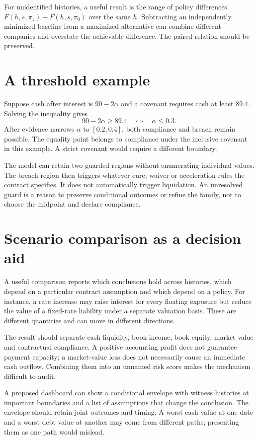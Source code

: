 For unidentified histories, a useful result is the range of policy differences $F(h,s,\pi_1)-F(h,s,\pi_0)$ over the same $h$. Subtracting an independently minimized baseline from a maximized alternative can combine different companies and overstate the achievable difference. The paired relation should be preserved.

\section{A threshold example}
Suppose cash after interest is $90-2\alpha$ and a covenant requires cash at least 89.4. Solving the inequality gives
\begin{equation}
 90-2\alpha\geq89.4\quad\Longleftrightarrow\quad\alpha\leq0.3.
\end{equation}
After evidence narrows $\alpha$ to $[0.2,0.4]$, both compliance and breach remain possible. The equality point belongs to compliance under the inclusive covenant in this example. A strict covenant would require a different boundary.

The model can retain two guarded regions without enumerating individual values. The breach region then triggers whatever cure, waiver or acceleration rules the contract specifies. It does not automatically trigger liquidation. An unresolved guard is a reason to preserve conditional outcomes or refine the family, not to choose the midpoint and declare compliance.

\section{Scenario comparison as a decision aid}
A useful comparison reports which conclusions hold across histories, which depend on a particular contract assumption and which depend on a policy. For instance, a rate increase may raise interest for every floating exposure but reduce the value of a fixed-rate liability under a separate valuation basis. These are different quantities and can move in different directions.

The result should separate cash liquidity, book income, book equity, market value and contractual compliance. A positive accounting profit does not guarantee payment capacity; a market-value loss does not necessarily cause an immediate cash outflow. Combining them into an unnamed risk score makes the mechanism difficult to audit.

A proposed dashboard can show a conditional envelope with witness histories at important boundaries and a list of assumptions that change the conclusion. The envelope should retain joint outcomes and timing. A worst cash value at one date and a worst debt value at another may come from different paths; presenting them as one path would mislead.


